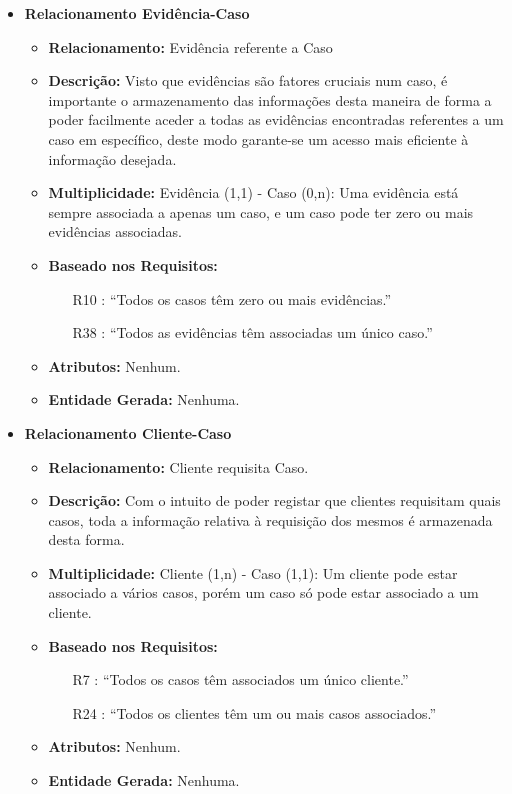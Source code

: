 \documentclass[a4paper,12pt]{scrreprt}
\begin{document}
\begin{itemize}
        \item\textbf{Relacionamento Evidência-Caso}
        \begin{itemize}
            \item\textbf{Relacionamento:} Evidência referente a Caso
            \item\textbf{Descrição:} Visto que evidências são fatores cruciais num caso, é importante o armazenamento das informações desta maneira de forma a poder facilmente aceder a todas as evidências encontradas referentes a um caso em específico, deste modo garante-se um acesso mais eficiente à informação desejada.
            \item\textbf{Multiplicidade:} Evidência (1,1) - Caso (0,n): Uma evidência está sempre associada a apenas um caso, e um caso pode ter zero ou mais evidências associadas.
            \item\textbf{Baseado nos Requisitos:}
            \begin{itemize}
                \item [R10]: “Todos os casos têm zero ou mais evidências.”
                \item [R38]: “Todos as evidências têm associadas um único caso.”
            \end{itemize}
            \item\textbf{Atributos:} Nenhum.
            \item\textbf{Entidade Gerada:} Nenhuma.
        \end{itemize}

        \vspace{0.75cm}

        \item\textbf{Relacionamento Cliente-Caso}
        \begin{itemize}
            \item\textbf{Relacionamento:} Cliente requisita Caso.
            \item\textbf{Descrição:} Com o intuito de poder registar que clientes requisitam quais casos, toda a informação relativa à requisição dos mesmos é armazenada desta forma.
            \item\textbf{Multiplicidade:} Cliente (1,n) - Caso (1,1): Um cliente pode estar associado a vários casos, porém um caso só pode estar associado a um cliente.
            \item\textbf{Baseado nos Requisitos:}
            \begin{itemize}
                \item [R7]: “Todos os casos têm associados um único cliente.”
                \item [R24]: “Todos os clientes têm um ou mais casos associados.”
            \end{itemize}
            \item\textbf{Atributos:} Nenhum.
            \item\textbf{Entidade Gerada:} Nenhuma.   
        \end{itemize}


\end{itemize}
\end{document}
